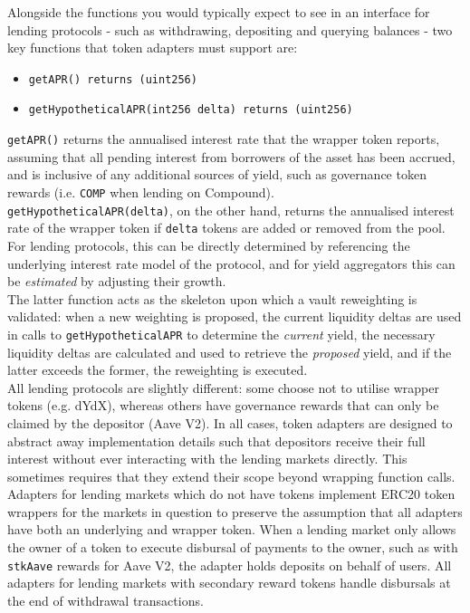 \documentclass{article}
\begin{document}
\noindent
Alongside the functions you would typically expect to see in an interface for lending protocols - such as withdrawing, depositing and querying balances - two key functions that token adapters must support are:

\begin{itemize}
    \item \texttt{getAPR() returns (uint256)}
    \item \texttt{getHypotheticalAPR(int256 delta) returns (uint256)}
\end{itemize}

\noindent
\texttt{getAPR()} returns the annualised interest rate that the wrapper token reports, assuming that all pending interest from borrowers of the asset has been accrued, and is inclusive of any additional sources of yield, such as governance token rewards (i.e. \texttt{COMP} when lending on Compound).\\

\noindent
\texttt{getHypotheticalAPR(delta)}, on the other hand, returns the annualised interest rate of the wrapper token if \texttt{delta} tokens are added or removed from the pool. For lending protocols, this can be directly determined by referencing the underlying interest rate model of the protocol, and for yield aggregators this can be \textit{estimated} by adjusting their growth.\\

\noindent
The latter function acts as the skeleton upon which a vault reweighting is validated: when a new weighting is proposed, the current liquidity deltas are used in calls to \texttt{getHypotheticalAPR} to determine the \textit{current} yield, the necessary liquidity deltas are calculated and used to retrieve the \textit{proposed} yield, and if the latter exceeds the former, the reweighting is executed.\\

\noindent
All lending protocols are slightly different: some choose not to utilise wrapper tokens (e.g. dYdX), whereas others have governance rewards that can only be claimed by the depositor (Aave V2). In all cases, token adapters are designed to abstract away implementation details such that depositors receive their full interest without ever interacting with the lending markets directly. This sometimes requires that they extend their scope beyond wrapping function calls.\\

\noindent
Adapters for lending markets which do not have tokens implement ERC20 token wrappers for the markets in question to preserve the assumption that all adapters have both an underlying and wrapper token. When a lending market only allows the owner of a token to execute disbursal of payments to the owner, such as with \texttt{stkAave} rewards for Aave V2, the adapter holds deposits on behalf of users. All adapters for lending markets with secondary reward tokens handle disbursals at the end of withdrawal transactions.\\
\end{document}
